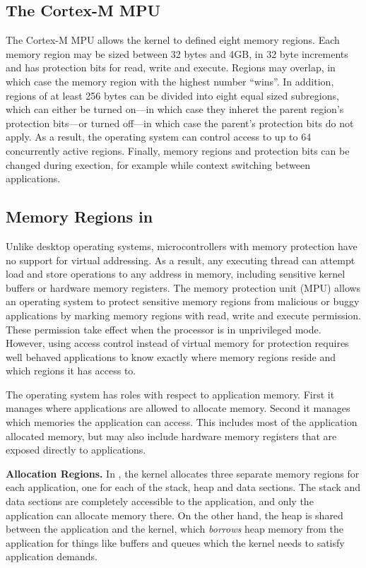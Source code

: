 \subsection{The Cortex-M MPU}

The Cortex-M MPU allows the kernel to defined eight memory regions. Each memory
region may be sized between 32 bytes and 4GB, in 32 byte increments and has
protection bits for read, write and execute. Regions may overlap, in which case
the memory region with the highest number ``wins''. In addition, regions of at
least 256 bytes can be divided into eight equal sized subregions, which can
either be turned on---in which case they inheret the parent region's protection
bits---or turned off---in which case the parent's protection bits do not apply.
As a result, the operating system can control access to up to 64 concurrently
active regions. Finally, memory regions and protection bits can be changed
during exection, for example while context switching between applications.

\subsection{Memory Regions in \name}

Unlike desktop operating systems, microcontrollers with memory protection have
no support for virtual addressing. As a result, any executing thread can attempt
load and store operations to any address in memory, including sensitive kernel
buffers or hardware memory registers. The memory protection unit (MPU) allows an
operating system to protect sensitive memory regions from malicious or buggy
applications by marking memory regions with read, write and execute permission.
These permission take effect when the processor is in unprivileged mode.
However, using access control instead of virtual memory for protection requires
well behaved applications to know exactly where memory regions reside and which
regions it has access to.

The operating system has roles with respect to application memory. First it
manages where applications are allowed to allocate memory. Second it manages
which memories the application can access. This includes most of the application
allocated memory, but may also include hardware memory registers that are
exposed directly to applications.

{\bf Allocation Regions.} 
In \name, the kernel allocates three separate memory regions for each
application, one for each of the stack, heap and data sections. The stack and
data sections are completely accessible to the application, and only the
application can allocate memory there. On the other hand, the heap is shared
between the application and the kernel, which \emph{borrows} heap memory from
the application for things like buffers and queues which the kernel needs
to satisfy application demands.

